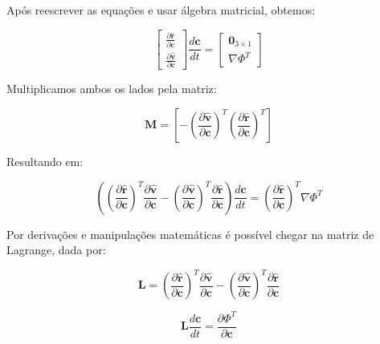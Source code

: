 \par Após reescrever as equações e usar álgebra matricial, obtemos:

\begin{equation}
\left[\begin{array}{c}\frac{\partial\hat{\textbf{r}}}{\partial\textbf{c}}\\ \frac{\partial\hat{\textbf{v}}}{\partial\textbf{c}}\end{array}\right]\frac{d\textbf{c}}{dt}=\left[\begin{array}{c}\textbf{0}_{3\times1}\\ \nabla\Phi^T\end{array}\right]
\label{eq:16L}
\end{equation}

\par Multiplicamos ambos os lados pela matriz:

\begin{equation}
\mathbf{M}=\left[-\left(\frac{\partial\hat{\mathbf{v}}}{\partial\mathbf{c}}\right)^T\left(\frac{\partial\hat{\mathbf{r}}}{\partial\mathbf{c}}\right)^T\right]
\label{eq:20L}
\end{equation}

\par Resultando em:

\begin{equation}
\left(\left(\frac{\partial\hat{\mathbf{r}}}{\partial\mathbf{c}}\right)^T\frac{\partial\hat{\mathbf{v}}}{\partial\mathbf{c}}-\left(\frac{\partial\hat{\mathbf{v}}}{\partial\mathbf{c}}\right)^T\frac{\partial\hat{\mathbf{r}}}{\partial\mathbf{c}}\right)\frac{d\mathbf{c}}{d t}=\left(\frac{\partial\hat{\mathbf{r}}}{\partial\mathbf{c}}\right)^T\nabla\Phi^T
\label{eq:21L}
\end{equation}

\par Por derivações e manipulações matemáticas é possível chegar na matriz de Lagrange, dada por:

\begin{equation}
\mathbf{L}=\left(\frac{\partial \hat{\mathbf{r}}}{\partial \mathbf{c}}\right)^T \frac{\partial \hat{\mathbf{v}}}{\partial \mathbf{c}}-\left(\frac{\partial \hat{\mathbf{v}}}{\partial \mathbf{c}}\right)^T \frac{\partial \hat{\mathbf{r}}}{\partial \mathbf{c}}
\label{eq:25L}
\end{equation}

\begin{equation}
\mathbf{L} \frac{d \mathbf{c}}{d t}=\frac{\partial \Phi^T}{\partial \mathbf{c}}
\label{eq:26L}
\end{equation}

